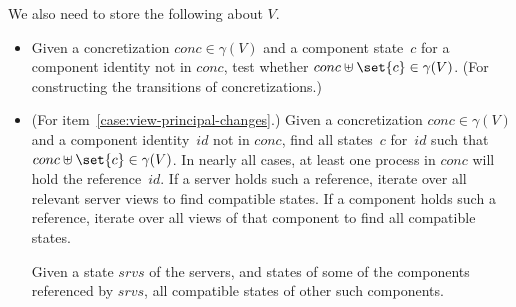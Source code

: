 We also need to store the following about $V$.
\begin{itemize}
\item
Given a concretization $conc \in \gamma(V)$ and a component state~$c$ for a
component identity not in $conc$, test whether $conc \uplus \set{c} \in
\gamma(V)$.  (For constructing the transitions of concretizations.)

\item (For item~\ref{case:view-principal-changes}.) Given a concretization
  $conc \in \gamma(V)$ and a component identity~$id$ not in $conc$, find all
  states~$c$ for~$id$ such that $conc \uplus \set{c} \in \gamma(V)$.  In
  nearly all cases, at least one process in $conc$ will hold the
  reference~$id$.  If a server holds such a reference, iterate over all
  relevant server views to find compatible states.  If a component holds such
  a reference, iterate over all views of that component to find all compatible
  states. 



Given a state $srvs$ of the servers, and states of some of the components
referenced by $srvs$, all compatible states of other such components.

\end{itemize}
